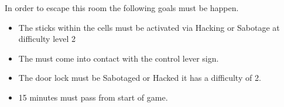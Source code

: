 \documentclass[green]{guildcamp4}
\begin{document}
\name{\gEscape{}}

In order to escape this room the following goals must be happen.

\begin{itemize}
	\item The sticks within the cells must be activated via Hacking or Sabotage at difficulty level 2
	\item The \iControlRod{} must come into contact with the control lever sign.
	\item The door lock must be Sabotaged or Hacked it has a difficulty of 2.
	\item 15 minutes must pass from start of game.
\end{itemize}
\end{document}
